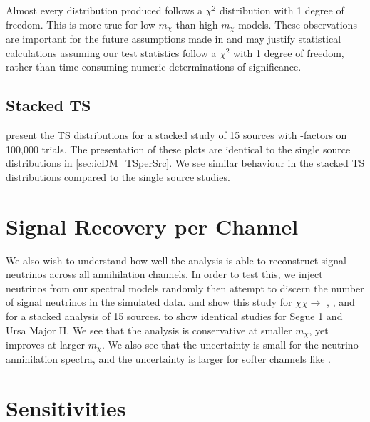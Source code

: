 Almost every distribution produced follows a $\chi^2$ distribution with 1 degree of freedom.
This is more true for low $m_\chi$ than high $m_\chi$ models.
These observations are important for the future assumptions made in  and may justify statistical calculations assuming our test statistics follow a $\chi^2$ with 1 degree of freedom, rather than time-consuming numeric determinations of significance.

\subsection{Stacked TS} \label{sec:icDM_TSstacked}

 present the TS distributions for a stacked study of 15 sources with \GS \J-factors on 100,000 trials.
The presentation of these plots are identical to the single source distributions in \cref{sec:icDM_TSperSrc}.
We see similar behaviour in the stacked TS distributions compared to the single source studies.

\section{Signal Recovery per Channel} \label{sec:icDM_sig_recovery}

We also wish to understand how well the analysis is able to reconstruct signal neutrinos across all annihilation channels.
In order to test this, we inject neutrinos from our spectral models randomly then attempt to discern the number of signal neutrinos in the simulated data.
 and  show this study for $\chi\chi \rightarrow$ , , and \parpar{\nu_\mu} for a stacked analysis of 15 sources.
 to  show identical studies for Segue 1 and Ursa Major II.
We see that the analysis is conservative at smaller $m_\chi$, yet improves at larger $m_\chi$.
We also see that the uncertainty is small for the neutrino annihilation spectra, and the uncertainty is larger for softer channels like .


\section{Sensitivities} \label{sec:icDM_sensitivity}

